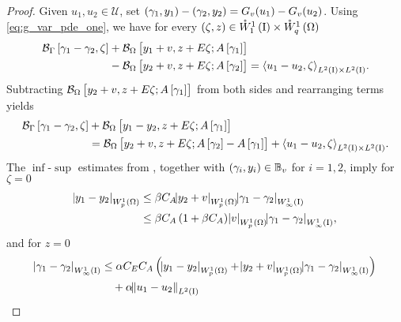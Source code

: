\documentclass[final]{siamltex}
\begin{document}
\begin{proof} 
Given $u_1, u_2 \in {\mathcal{U}}$, set $ \del{\gamma_1,y_1} - \del{\gamma_2, y_2} = G_v(u_1) - G_v(u_2)$. Using 
\eqref{eq:g_var_pde_one}, we have for every $\del{\zeta,z} \in {{\mathring{W}^{1}_{1}\del{{\text{\rm I}}}}} \times {{\mathring{W}^{{1}}_{{q}}\del{{\Omega}}}}$
	\begin{align*}
	    	{{\mathcal{B}}_\Gamma}\sbr{\gamma_1-\gamma_2,\zeta} &+ {{\mathcal{B}}_\Omega}\sbr{y_1+v,z + E\zeta;A\sbr{\gamma_1}} \\
	    			&- {{\mathcal{B}}_\Omega}\sbr{y_2+v,z+E\zeta;A\sbr{\gamma_2}} = {{\mathop{{\left\langle {{u_1 - u_2,\zeta}} \right\rangle}}}_{{{L^2\del{{{\text{\rm I}}}}}}\times{{L^2\del{{{\text{\rm I}}}}}}}}.
	\end{align*}
	Subtracting ${{\mathcal{B}}_\Omega}\sbr{y_2+v,z+E\zeta;A\sbr{\gamma_1}}$ from both sides and rearranging terms yields
	\begin{align*}
	    {{\mathcal{B}}_\Gamma}\sbr{\gamma_1-\gamma_2,\zeta} &+ {{\mathcal{B}}_\Omega}\sbr{y_1-y_2,z+E\zeta;A\sbr{\gamma_1}}  \\ 
	    	&= {{\mathcal{B}}_\Omega}\sbr{y_2+v,z+E\zeta;A\sbr{\gamma_2}-A\sbr{\gamma_1}} +  {{\mathop{{\left\langle {{u_1 - u_2,\zeta}} \right\rangle}}}_{{{L^2\del{{{\text{\rm I}}}}}}\times{{L^2\del{{{\text{\rm I}}}}}}}}. 
	\end{align*}
	The $\inf$-$\sup$ estimates from , together with $\del{\gamma_i, y_i} \in {\mathbb{B}}_v$ for $i=1,2$, imply for $\zeta = 0$
	\begin{align}\label{eq:g_lipschitz_y}
		{\abs{{y_1-y_2}}_{{W^{{{1}}}_{{{p}}}\del{{{\Omega}}}}}} 
			&\leq \beta C_A{\abs{{y_2+v}}_{{W^{{{1}}}_{{{p}}}\del{{{\Omega}}}}}} {\abs{{\gamma_1-\gamma_2}}_{{W^{{{1}}}_{{{\infty}}}\del{{\text{\rm I}}}}}} \nonumber \\ 
			&\leq \beta C_A\del{1+\beta C_A }{\abs{{v}}_{{W^{{1}}_{{p}}\del{{\Omega}}}}}{\abs{{\gamma_1-\gamma_2}}_{{W^{{{1}}}_{{{\infty}}}\del{{\text{\rm I}}}}}} ,
	\end{align}
	and for $z=0$
	\begin{align*}
		{\abs{{\gamma_1 - \gamma_2}}_{{W^{{{1}}}_{{{\infty}}}\del{{\text{\rm I}}}}}}
			&\leq \alpha C_EC_A\del{{\abs{{y_1-y_2}}_{{W^{{{1}}}_{{{p}}}\del{{{\Omega}}}}}}
				+ {\abs{{y_2+v}}_{{W^{{{1}}}_{{{p}}}\del{{{\Omega}}}}}}{\abs{{\gamma_1 - \gamma_2}}_{{W^{{{1}}}_{{{\infty}}}\del{{\text{\rm I}}}}}}}  \\
			&\quad + \alpha {\norm{{u_1 - u_2}}_{{L^2\del{{{\text{\rm I}}}}}}}  \\ 

\end{align*}
\end{proof}
\end{document}
